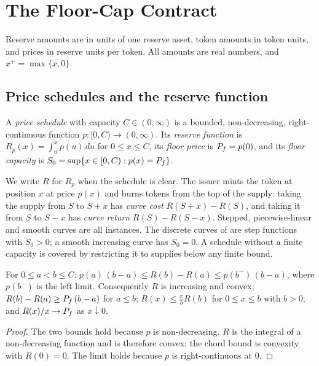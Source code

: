\section{The Floor-Cap Contract}\label{sec:model}

Reserve amounts are in units of one reserve asset, token amounts in token units, and prices in reserve units per token. All amounts are real numbers, and $x^+=\max\{x,0\}$.

\subsection{Price schedules and the reserve function}

\begin{definition}\label{def:schedule}
A \emph{price schedule} with capacity $C\in(0,\infty)$ is a bounded, non-decreasing, right-continuous function $p:[0,C)\to(0,\infty)$. Its \emph{reserve function} is $R_p(x)=\int_0^x p(u)\,du$ for $0\le x\le C$, its \emph{floor price} is $P_f=p(0)$, and its \emph{floor capacity} is $S_0=\sup\{x\in[0,C): p(x)=P_f\}$.
\end{definition}

We write $R$ for $R_p$ when the schedule is clear. The issuer mints the token at position $x$ at price $p(x)$ and burns tokens from the top of the supply: taking the supply from $S$ to $S+x$ has \emph{curve cost} $R(S+x)-R(S)$, and taking it from $S$ to $S-x$ has \emph{curve return} $R(S)-R(S-x)$. Stepped, piecewise-linear and smooth curves are all instances. The discrete curves of \vone{} are step functions with $S_0>0$; a smooth increasing curve has $S_0=0$. A schedule without a finite capacity is covered by restricting it to supplies below any finite bound.

\begin{lemma}\label{lem:R}
For $0\le a<b\le C$: $p(a)\,(b-a)\le R(b)-R(a)\le p(b^-)\,(b-a)$, where $p(b^-)$ is the left limit. Consequently $R$ is increasing and convex; $R(b)-R(a)\ge P_f\,(b-a)$ for $a\le b$; $R(x)\le \tfrac{x}{b}R(b)$ for $0\le x\le b$ with $b>0$; and $R(x)/x\to P_f$ as $x\downarrow0$.
\end{lemma}
\begin{proof}
The two bounds hold because $p$ is non-decreasing. $R$ is the integral of a non-decreasing function and is therefore convex; the chord bound is convexity with $R(0)=0$. The limit holds because $p$ is right-continuous at $0$.
\end{proof}

